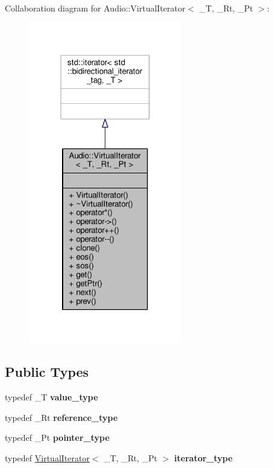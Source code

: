 Collaboration diagram for Audio\+:\+:Virtual\+Iterator$<$ \+\_\+T, \+\_\+\+Rt, \+\_\+\+Pt $>$\+:
\nopagebreak
\begin{figure}[H]
\begin{center}
\leavevmode
\includegraphics[width=190pt]{d6/d7a/classAudio_1_1VirtualIterator__coll__graph}
\end{center}
\end{figure}
\subsection*{Public Types}
\begin{DoxyCompactItemize}
\item 
typedef \+\_\+T {\bfseries value\+\_\+type}\hypertarget{classAudio_1_1VirtualIterator_ae90331c5a8af46115c4a2366a7786de4}{}\label{classAudio_1_1VirtualIterator_ae90331c5a8af46115c4a2366a7786de4}

\item 
typedef \+\_\+\+Rt {\bfseries reference\+\_\+type}\hypertarget{classAudio_1_1VirtualIterator_ab437c79a5e631491fe40c01c51a09f44}{}\label{classAudio_1_1VirtualIterator_ab437c79a5e631491fe40c01c51a09f44}

\item 
typedef \+\_\+\+Pt {\bfseries pointer\+\_\+type}\hypertarget{classAudio_1_1VirtualIterator_a9ffbfddf2560442e70d2b3a75fe929c8}{}\label{classAudio_1_1VirtualIterator_a9ffbfddf2560442e70d2b3a75fe929c8}

\item 
typedef \hyperlink{classAudio_1_1VirtualIterator}{Virtual\+Iterator}$<$ \+\_\+T, \+\_\+\+Rt, \+\_\+\+Pt $>$ {\bfseries iterator\+\_\+type}\hypertarget{classAudio_1_1VirtualIterator_ac9d1d449a981525311c19d8698e6b843}{}\label{classAudio_1_1VirtualIterator_ac9d1d449a981525311c19d8698e6b843}

\end{DoxyCompactItemize}
